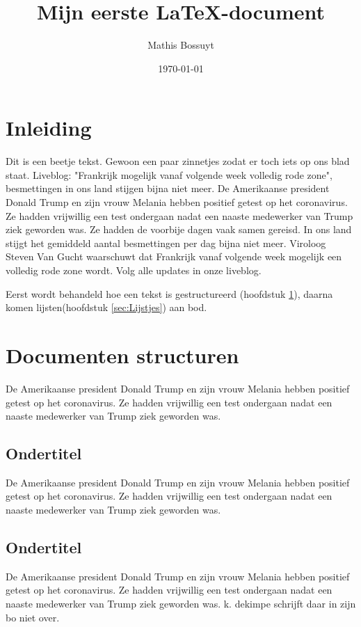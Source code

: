 \documentclass{article}
\title{Mijn eerste \LaTeX-document}
\author{Mathis Bossuyt}
\date{\today}
\begin{document}
\maketitle

\tableofcontents
\listoffigures
\section*{Inleiding}
	
	Dit is een beetje tekst. Gewoon een paar zinnetjes zodat er toch iets op ons blad staat. Liveblog: "Frankrijk mogelijk vanaf volgende week volledig rode zone", besmettingen in ons land stijgen bijna niet meer.
	De Amerikaanse president Donald Trump en zijn vrouw Melania hebben positief getest op het coronavirus. Ze hadden vrijwillig een test ondergaan nadat een naaste medewerker van Trump ziek geworden was. Ze hadden de voorbije dagen vaak samen gereisd. In ons land stijgt het gemiddeld aantal besmettingen per dag bijna niet meer. Viroloog Steven Van Gucht waarschuwt dat Frankrijk vanaf volgende week mogelijk een volledig rode zone wordt. Volg alle updates in onze liveblog.
	
	Eerst wordt behandeld hoe een tekst is gestructureerd (hoofdstuk \ref{sec:Documenten structuren}), daarna komen lijsten(hoofdstuk \ref{sec:Lijstjes}) aan bod.
\section{Documenten structuren}
\label{sec:Documenten structuren}
	De Amerikaanse president Donald Trump en zijn vrouw Melania hebben positief getest op het coronavirus. Ze hadden vrijwillig een test ondergaan nadat een naaste medewerker van Trump ziek geworden was.
\subsection{Ondertitel}
	De Amerikaanse president Donald Trump en zijn vrouw Melania hebben positief getest op het coronavirus. Ze hadden vrijwillig een test ondergaan nadat een naaste medewerker van Trump ziek geworden was.
\subsection{Ondertitel}
	De Amerikaanse president Donald Trump en zijn vrouw Melania hebben positief getest op het coronavirus. Ze hadden vrijwillig een test ondergaan nadat een naaste medewerker van Trump ziek geworden was.
	k. dekimpe schrijft daar in zijn bo \cite{dekimpe2006almost} niet over.
\end{document}
